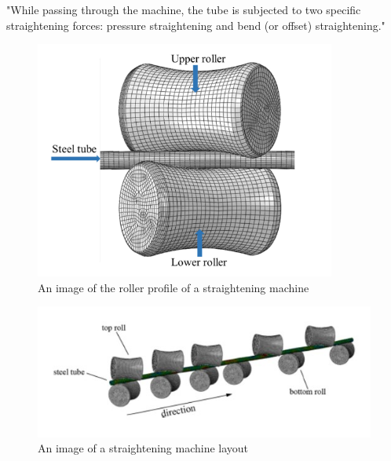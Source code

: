 \documentclass{article}
\begin{document}
"While passing through the machine, the tube is subjected to two specific straightening forces: pressure straightening and bend (or offset) straightening."

\begin{figure}[H]
	\centering
	\includegraphics[keepaspectratio]{straightening2.png}
	\caption{An image of the roller profile of a straightening machine~\cite{ma2020effect}}
	\label{straighteningImage2}
\end{figure}


\begin{figure}[H]
	\centering
	\includegraphics[]{straightening3.jpg}
	\caption{An image of a straightening machine layout~\cite{ma2021analysis}}
	\label{straighteningImage3}
\end{figure}

\end{document}
